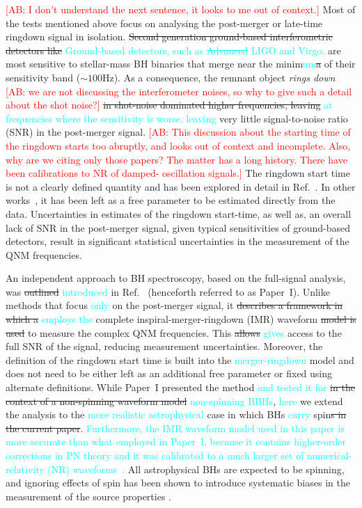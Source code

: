 \documentclass[twocolumn,prd,aps,superscriptaddress,preprintnumbers,tightenlines,showpacs,nofootinbib,eqsecnum,amsfonts,amsmath]{revtex4-1}
\newcommand{\paperone}{Paper~I\xspace}
\newcommand{\ab}[1]{\textcolor{cyan}{#1}}
\newcommand{\comment}[1]{\textcolor{red}{[#1]}}
\begin{document}
\comment{AB: I don't understand the next sentence, it looks to me out of context.} 
Most of the tests mentioned above focus on analysing the post-merger
or late-time ringdown signal in isolation. \sout{Second generation
ground-based interferometric detectors like} \ab{Ground-based detectors, 
such as \sout{Advanced} LIGO and Virgo,} are most sensitive to 
stellar-mass BH binaries that merge near the
minim\ab{um}\sout{a} of their sensitivity band ($\sim 100$Hz). As a consequence, the
remnant object \textit{rings down} \comment{AB: we are not discussing the interferometer noises, 
so why to give such a detail about the shot noise?} \sout{in shot-noise dominated higher
frequencies, leaving} \ab{at frequencies where the sensitivity is worse, leaving} 
very little signal-to-noise ratio (SNR) in the
post-merger signal. \comment{AB: This discussion about the starting time of the ringdown starts too abruptly, 
and looks out of context and incomplete. Also, why are we citing only those papers? The matter 
has a long history. There have been calibrations to NR of damped- oscillation signals.} 
The ringdown start time is not a clearly defined
quantity and has been explored in detail
in Ref.~\citep{Bhagwat:2017tkm}. In other
works~\citep{Carullo:2018gah,Carullo:2019flw}, it has been left as a
free parameter to be estimated directly from the data. Uncertainties
in estimates of the ringdown start-time, as well as, an overall lack of
SNR in the post-merger signal, given typical sensitivities of
ground-based detectors, result in significant statistical uncertainties
in the measurement of the QNM frequencies. 

An independent approach to BH spectroscopy, based on the full-signal
analysis, was \sout{outlined} \ab{introduced} in Ref.~\citep{Brito:2018rfr} 
(henceforth referred to as \paperone). Unlike methods that focus \ab{only} 
on the post-merger signal, it \sout{describes a framework in which a} 
\ab{employs the} complete inspiral-merger-ringdown
(IMR) waveform \sout{model is used} to measure the complex QNM
frequencies. This \sout{allows} \ab{gives} access to the full SNR of the signal,
reducing measurement uncertainties. Moreover, the definition of the
ringdown start time is built into the \ab{merger-ringdown} model and does not need to be
either left as an additional free parameter or fixed using alternate
definitions. While \paperone presented the method \ab{and tested it for }\sout{in the context of a
non-spinning waveform model} \ab{non-spinning BBHs}, \ab{here} we extend the analysis to the \ab{more 
realistic astrophysical} case in which BHs \ab{carry} spin\sout{s in the current paper}. \ab{Furthermore, 
the IMR waveform model used in this paper is more accurate than what employed in \paperone, 
because it contains higher-order corrections in PN theory and it was calibrated to a much larger set 
of numerical-relativity (NR) waveforms~\cite{Bohe:2016gbl}.}  All astrophysical BHs are expected to be spinning, 
and ignoring effects of spin has been shown to introduce systematic biases in the measurement of the 
source properties \cite{paper_showing_systematics_from_ignoring_spin}.
\end{document}
